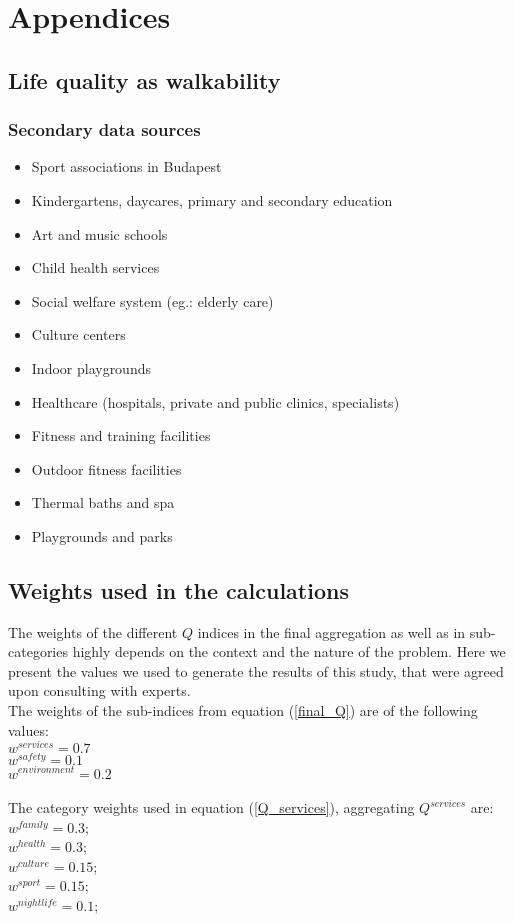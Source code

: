 \chapter{Appendices}

\section{Life quality as walkability}

\subsection{Secondary data sources}
\label{SI:walkabilityData}
\begin{itemize}
  \item {Sport associations in Budapest}~\cite{HU_sport}
  \item {Kindergartens, daycares, primary and secondary education}~\cite{HU_Edu}
  \item {Art and music schools}~\cite{HU_Art}
  \item {Child health services}~\cite{HU_Child}
  \item {Social welfare system (eg.: elderly care)}~\cite{HU_Social}
  \item{Culture centers}~\cite{HU_Cult}
  \item {Indoor playgrounds}~\cite{HU_Play}
  \item{Healthcare (hospitals, private and public clinics, specialists)}~\cite{HU_Health}
  \item{Fitness and training facilities}~\cite{HU_Fitness}
  \item{Outdoor fitness facilities}~\cite{HU_outfitness}
  \item{Thermal baths and spa}~\cite{HU_Thermal}
  \item{Playgrounds and parks}~\cite{HU_Park}
\end{itemize}

\section{Weights used in the calculations}
The weights of the different $Q$ indices in the final aggregation as well as in sub-categories highly depends on the context and the nature of the problem. Here we present the values we used to generate the results of this study, that were agreed upon consulting with experts.\\
The weights of the sub-indices from equation (\ref{final_Q}) are of the following values:\\
$w^{services}=0.7$\\
$w^{safety}=0.1$\\
$w^{environment}=0.2$\\ \\
The category weights used in equation (\ref{Q_services}), aggregating $Q^{services}$ are:\\
$w^{family}= 0.3$;\\
$w^{health}= 0.3$;\\
$w^{culture} = 0.15$;\\
$w^{sport} = 0.15$;\\
$w^{night life}=0.1$;\\